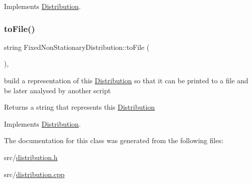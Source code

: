 Implements \mbox{\hyperlink{class_distribution_ac9c74d18549f532caa09ae86d8b25b55}{Distribution}}.

\mbox{\label{class_fixed_non_stationary_distribution_aaea49214758451b31f83a272af1626e0}} 
\subsubsection{\texorpdfstring{to\+File()}{toFile()}}
{\footnotesize\ttfamily string Fixed\+Non\+Stationary\+Distribution\+::to\+File (\begin{DoxyParamCaption}{ }\end{DoxyParamCaption})\hspace{0.3cm}{\ttfamily [override]}, {\ttfamily [virtual]}}



build a representation of this \mbox{\hyperlink{class_distribution}{Distribution}} so that it can be printed to a file and be later analysed by another script 

\begin{DoxyReturn}{Returns}
a string that represents this \mbox{\hyperlink{class_distribution}{Distribution}} 
\end{DoxyReturn}


Implements \mbox{\hyperlink{class_distribution_ac41d57a4d7f82041810f886590a236a5}{Distribution}}.



The documentation for this class was generated from the following files\+:\begin{DoxyCompactItemize}
\item 
src/\mbox{\hyperlink{distribution_8h}{distribution.\+h}}\item 
src/\mbox{\hyperlink{distribution_8cpp}{distribution.\+cpp}}\end{DoxyCompactItemize}

